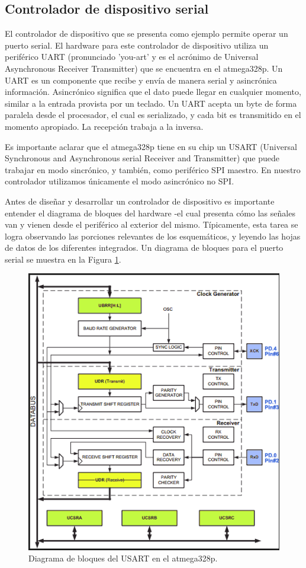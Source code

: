 \documentclass[12pt]{article}
\begin{document}
\subsection *{Controlador de dispositivo serial}

El controlador de dispositivo que se presenta como ejemplo permite
operar un puerto serial. El hardware para este controlador
de dispositivo utiliza un periférico UART 
(pronunciado 'you-art' y es el acrónimo de
Universal Asynchronous Receiver Transmitter) que se encuentra en el atmega328p.
Un UART es un componente que recibe y envía de manera serial y asincrónica
información. Asincrónico significa que el dato puede llegar en cualquier
momento, similar a la entrada provista por un teclado. Un UART acepta
un byte de forma paralela desde el procesador, el cual es serializado,
y cada bit es transmitido en el momento apropiado. La recepción trabaja
a la inversa.

Es importante aclarar que el atmega328p tiene en su chip un USART (Universal Synchronous and Asynchronous serial Receiver and Transmitter) que puede trabajar
en modo sincrónico, y también, como periférico SPI maestro. En nuestro
controlador utilizamos únicamente el modo asincrónico no SPI.

Antes de diseñar y desarrollar un controlador de dispositivo 
es importante entender el diagrama de bloques del hardware -el cual
presenta cómo las señales van y vienen desde el periférico al exterior del mismo.
Típicamente, esta tarea se logra  observando las porciones relevantes de los
esquemáticos, y leyendo las hojas de datos de los diferentes integrados.
Un diagrama de bloques para el puerto serial se muestra en la Figura \ref{fig:usart-block}.

\begin{figure}
\includegraphics[width=\linewidth]{usart-block.png}
\caption{Diagrama de bloques del USART en el atmega328p.}
\label{fig:usart-block}
\end{figure}
\end{document}
